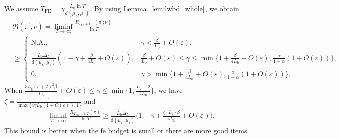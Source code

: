 \documentclass[twoside,11pt]{article}
\newcommand{\rmb}{\mathrm{b}}
\newcommand{\rmd}{\mathrm{d}}
\newcommand{\rmg}{\mathrm{g}}
\newcommand{\Tfe}{T_{\mathrm{FE}}}
\begin{document}
We assume $\Tfe = \gamma \frac{L_{\rmb}\ln T}{d(\mu_L,\mu_1)}$. By using Lemma~\ref{lem:lwbd_whole}, we obtain
\begin{align}\label{equ:tight_low_two_value}
    &\underline{\mathfrak{R}}(\pi^\prime,\nu)=
    \liminf_{T\to\infty} \frac{R_{\Tfe+1:T} (\pi^\prime;\nu ) }{\ln T}
    \\
    &\geq
    \begin{cases}
        \mbox{N.A.},& \gamma<\frac{\beta}{L_{\rmb}}+O(\varepsilon),
        \\
        \frac{L_{\rmb}\Delta_L}{\rmd(\mu_L,\mu_1)}(1-\gamma+\frac{\beta}{4L_{\rmb}}+O(\varepsilon)),&
        \frac{\beta}{L_{\rmb}} + O(\varepsilon)\!\leq\! \gamma\!\leq \!\min\!\big\{1+\frac{\beta}{4L_{\rmb}}+O(\varepsilon),\frac{\alpha}{1-\alpha}(1+O(\varepsilon))\big\},\!
        \\
        0,& \gamma> \min\!\big\{1+\frac{\beta}{4L_{\rmb}}+O(\varepsilon),\frac{\alpha}{1-\alpha}(1+O(\varepsilon))\big\}.\!
    \end{cases}
 \end{align}
When $\frac{3L_{\rmg}(c+2)^2\beta}{L_{\rmb}} + O(\varepsilon)\leq \gamma\leq \min\big\{1,\frac{L_{\rmg}-2}{4L_{\rmb}}\big\}$, we have $\zeta = \frac{1}{\max\{4\gamma L_{\rmb}(1+O(\varepsilon)),1\}}$ and 
\begin{align}
    \liminf_{T\to\infty} \frac{R_{\Tfe+1:T} (\pi ) }{\ln T}
    \geq
    \frac{L_{\rmb}\Delta_L}{\rmd(\mu_L,\mu_1)}
    \bigg(1-\gamma+\frac{\zeta \cdot L_{\rmg}\cdot\beta}{4L_{\rmb}}+O(\varepsilon)\bigg).
\end{align}
This bound is better when the \ac{fe} budget is small  or there are more good items.
\end{document}
